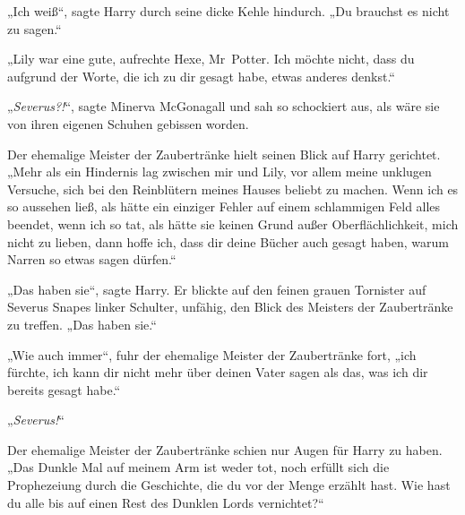 „Ich weiß“, sagte Harry durch seine dicke Kehle hindurch.
„Du brauchst es nicht zu sagen.“

„Lily war eine gute, aufrechte Hexe, Mr~Potter. Ich möchte nicht, dass du aufgrund der Worte, die ich zu dir gesagt habe, etwas anderes denkst.“

„\emph{Severus?!}“, sagte Minerva McGonagall und sah so schockiert aus, als wäre sie von ihren eigenen Schuhen gebissen worden.

Der ehemalige Meister der Zaubertränke hielt seinen Blick auf Harry gerichtet.
„Mehr als ein Hindernis lag zwischen mir und Lily, vor allem meine unklugen Versuche, sich bei den Reinblütern meines Hauses beliebt zu machen. Wenn ich es so aussehen ließ, als hätte ein einziger Fehler auf einem schlammigen Feld alles beendet, wenn ich so tat, als hätte sie keinen Grund außer Oberflächlichkeit, mich nicht zu lieben, dann hoffe ich, dass dir deine Bücher auch gesagt haben, warum Narren so etwas sagen dürfen.“

„Das haben sie“, sagte Harry.
Er blickte auf den feinen grauen Tornister auf Severus Snapes linker Schulter, unfähig, den Blick des Meisters der Zaubertränke zu treffen.
„Das haben sie.“

„Wie auch immer“, fuhr der ehemalige Meister der Zaubertränke fort, „ich fürchte, ich kann dir nicht mehr über deinen Vater sagen als das, was ich dir bereits gesagt habe.“

„\emph{Severus!}“

Der ehemalige Meister der Zaubertränke schien nur Augen für Harry zu haben.
„Das Dunkle Mal auf meinem Arm ist weder tot, noch erfüllt sich die Prophezeiung durch die Geschichte, die du vor der Menge erzählt hast. Wie hast du alle bis auf einen Rest des Dunklen Lords vernichtet?“

